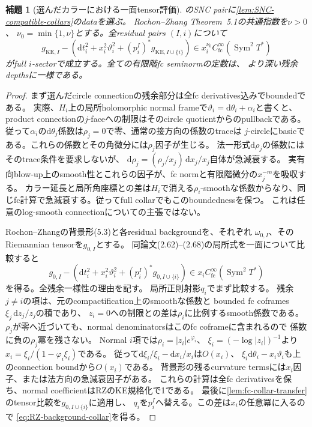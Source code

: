 \documentclass[11pt,a4paper]{ltjsarticle}
\newcommand{\dd}{\mathrm d}
\theoremstyle{plain}
\newtheorem{lemma}[lemma]{補題}
\theoremstyle{definition}
\theoremstyle{remark}
\begin{document}
\begin{lemma}[選んだカラーにおける一面tensor評価]
\label{lem:RZ-collar-tensor}
のSNC pairに\cref{lem:SNC-compatible-collars}のdataを選ぶ。
Rochon--Zhang Theorem~5.1の共通指数を$\nu>0$、
$\nu_0=\min\{1,\nu\}$とする。全residual pairs $(I,i)$について
\begin{equation}
\label{eq:RZ-collar-tensor}
 g_{\mathrm{KE},I}
 -\left(\dd t_i^2+x_i^2\vartheta_i^2
           +(p_i^I)^*g_{\mathrm{KE},I\cup\{i\}}\right)
 \in x_i^{\nu_0}C^\infty_{\mathrm{fc}}(\operatorname{Sym}^2T^*)
\end{equation}
がfull $i$-sectorで成立する。全ての有限階fc seminormの定数は、
より深い残余depthsに一様である。
\end{lemma}
\begin{proof}
まず選んだcircle connectionの残余部分は全fc derivatives込みでboundedである。
実際、$H_i$上の局所holomorphic normal frameで$\vartheta_i=\dd\theta_i+\alpha_i$と書くと、
product connectionの$j$-faceへの制限はそのcircle quotientからのpullbackである。
従って$\alpha_i$の$\dd\theta_j$係数は$\rho_j=0$で零、通常の接方向の係数のtraceは
$j$-circleにbasicである。これらの係数とその角微分には$\rho_j$因子が生じる。
法一形式$\dd\rho_j$の係数にはそのtrace条件を要求しないが、
$\dd\rho_j=(\rho_j/x_j)\,\dd x_j/x_j$自体が急減衰する。
実有向blow-up上のsmooth性とこれらの因子が、fc normと有限階微分の$x_j^{-m}$を吸収する。
カラー延長と局所角座標との差は$H_i$で消える$\rho_i$-smoothな係数からなり、同じfc計算で急減衰する。従ってfull collarでもこのboundednessを保つ。
これは任意のlog-smooth connectionについての主張ではない。

Rochon--Zhangの背景形(5.3)と各residual backgroundを、それぞれ
$\omega_{0,I}$、そのRiemannian tensorを$g_{0,I}$とする。
同論文(2.62)--(2.68)の局所式を一面について比較すると
\begin{equation}
\label{eq:RZ-background-collar}
 g_{0,I}-\left(\dd t_i^2+x_i^2\vartheta_i^2
                  +(p_i^I)^*g_{0,I\cup\{i\}}\right)
 \in x_i C^\infty_{\mathrm{fc}}(\operatorname{Sym}^2T^*)
\end{equation}
を得る。全残余一様性の理由を記す。
局所正則射影$q_i$でまず比較する。
残余$j\ne i$の項は、元のcompactification上のsmoothな係数と
bounded fc coframes $\xi_j\,\dd z_j/z_j$の積であり、
$z_i=0$への制限との差は$\rho_i$に比例するsmooth係数である。
$\rho_j$が零へ近づいても、normal denominatorsはこのfc coframeに含まれるので
係数に負の$\rho_j$冪を残さない。
Normal $i$項では$\rho_i=|z_i|e^{\varphi_i}$、
$\xi_i=(-\log|z_i|)^{-1}$より
$x_i=\xi_i/(1-\varphi_i\xi_i)$である。
従って$\dd\xi_i/\xi_i-\dd x_i/x_i$は$O(x_i)$、
$\xi_i\dd\theta_i-x_i\vartheta_i$も上のconnection boundから$O(x_i)$である。
背景形の残るcurvature termsには$x_i$因子、または法方向の急減衰因子がある。
これらの計算は全fc derivativesを保ち、normal coefficientはRZのKE規格化で1である。
最後に\cref{lem:fc-collar-transfer}のtensor比較を$g_{0,I\cup\{i\}}$に適用し、
$q_i$を$p_i^I$へ替える。この差は$x_i$の任意冪に入るので
\eqref{eq:RZ-background-collar}を得る。


\end{proof}
\end{document}
